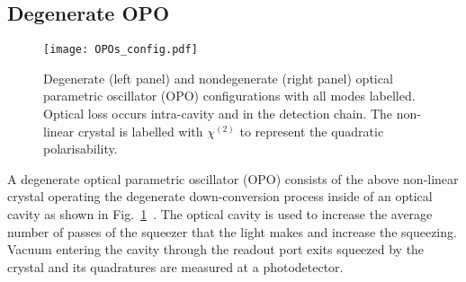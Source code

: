 \subsection{Degenerate OPO}

\begin{figure}
	\centering
	\texttt{[image: OPOs\_config.pdf]}
	\caption{ Degenerate (left panel) and nondegenerate (right panel) optical parametric oscillator (OPO) configurations with all modes labelled. Optical loss occurs intra-cavity and in the detection chain. The non-linear crystal is labelled with $\chi^{(2)}$ to represent the quadratic polarisability. %
	}
	\label{fig:OPOs_config}
\end{figure}

A degenerate optical parametric oscillator (OPO) consists of the above non-linear crystal operating the degenerate down-conversion process inside of an optical cavity as shown in Fig.~\ref{fig:OPOs_config}~\cite{}. The optical cavity is used to increase the average number of passes of the squeezer that the light makes and increase the squeezing. Vacuum entering the cavity through the readout port exits squeezed by the crystal and its quadratures are measured at a photodetector.


